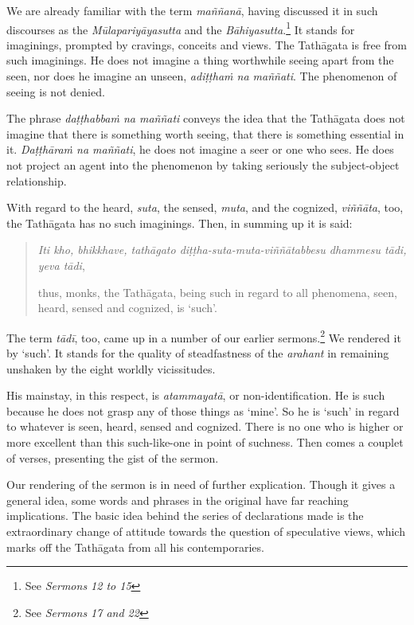 We are already familiar with the term \emph{maññanā}, having discussed it in such discourses as the \emph{Mūlapariyāyasutta} and the \emph{Bāhiyasutta}.\footnote{See \emph{Sermons 12 to 15}} It stands for imaginings, prompted by cravings, conceits and views. The Tathāgata is free from such imaginings. He does not imagine a thing worthwhile seeing apart from the seen, nor does he imagine an unseen, \emph{adiṭṭhaṁ na maññati}. The phenomenon of seeing is not denied.

The phrase \emph{daṭṭhabbaṁ na maññati} conveys the idea that the Tathāgata does not imagine that there is something worth seeing, that there is something essential in it. \emph{Daṭṭhāraṁ na maññati}, he does not imagine a seer or one who sees. He does not project an agent into the phenomenon by taking seriously the subject-object relationship.

With regard to the heard, \emph{suta}, the sensed, \emph{muta}, and the cognized, \emph{viññāta}, too, the Tathāgata has no such imaginings. Then, in summing up it is said:

\begin{quote}
\emph{Iti kho, bhikkhave, tathāgato diṭṭha-suta-muta-viññātabbesu dhammesu tādi, yeva tādi},

thus, monks, the Tathāgata, being such in regard to all phenomena, seen, heard, sensed and cognized, is `such'.
\end{quote}

The term \emph{tādī}, too, came up in a number of our earlier sermons.\footnote{See \emph{Sermons 17 and 22}} We rendered it by `such'. It stands for the quality of steadfastness of the \emph{arahant} in remaining unshaken by the eight worldly vicissitudes.

His mainstay, in this respect, is \emph{atammayatā}, or non-identification. He is such because he does not grasp any of those things as `mine'. So he is `such' in regard to whatever is seen, heard, sensed and cognized. There is no one who is higher or more excellent than this such-like-one in point of suchness. Then comes a couplet of verses, presenting the gist of the sermon.

Our rendering of the sermon is in need of further explication. Though it gives a general idea, some words and phrases in the original have far reaching implications. The basic idea behind the series of declarations made is the extraordinary change of attitude towards the question of speculative views, which marks off the Tathāgata from all his contemporaries.

